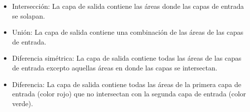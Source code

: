 \begin{itemize}
    \item Intersección: La capa de salida contiene las áreas donde las capas de entrada se solapan.
    \item Unión: La capa de salida contiene una combinación de las áreas de las capas de entrada.
    \item Diferencia simétrica: La capa de salida contiene todas las áreas de las capas de entrada excepto aquellas áreas en donde las capas se intersectan.
    \item Diferencia: La capa de salida contiene todas las áreas de la primera capa de entrada (color rojo) que no intersectan con la segunda capa de entrada (color verde).
\end{itemize}

